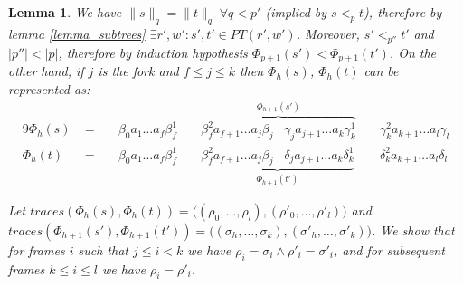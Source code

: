 \documentclass[AMA,STIX1COL]{WileyNJD-v2}
\newcommand{\Xl}{\langle}
\newcommand{\Xr}{\rangle}
\newtheorem{XLem}{Lemma}
\begin{document}
\begin{XLem}
    We have $\|s\|_q = \|t\|_q \;\forall q < p'$ (implied by $s <_p t$),
    therefore by lemma \ref{lemma_subtrees} $\exists r', w' : s', t' \in PT(r', w')$.
    Moreover, $s' <_{p''} t'$ and $|p''| < |p|$, therefore by induction hypothesis $\Phi_{p+1}(s') < \Phi_{p+1}(t')$.
    On the other hand, if $j$ is the fork and $f \leq j \leq k$ then
    $\Phi_{h}(s)$, $\Phi_{h}(t)$ can be represented as:
    \begin{alignat*}{9}
        \Phi_{h}(s)
            \;&=
                \;&& \beta_0 a_1 \dots a_f \beta_f^1
                \;&& \overbrace {\beta_f^2  a_{f+1} \dots a_j \beta_j \;\big|\; \gamma_j a_{j+1} \dots a_k \gamma_k^1}^{\Phi_{h+1}(s')}
                \;&& \gamma_k^2 a_{k+1} \dots a_l \gamma_l
                \\[-0.5em]
        \Phi_{h}(t)
            \;&=
                \;&& \beta_0 a_1 \dots a_f \beta_f^1
                \;&& \underbrace {\beta_f^2  a_{f+1} \dots a_j \beta_j \;\big|\; \delta_j a_{j+1} \dots a_k \delta_k^1}_{\Phi_{h+1}(t')}
                \;&& \delta_k^2 a_{k+1} \dots a_l \delta_l
    \end{alignat*}


    Let $traces (\Phi_{h}(s), \Phi_{h}(t)) = \big( (\rho_0, \dots, \rho_l), (\rho'_0, \dots, \rho'_l) \big)$
    and $traces (\Phi_{h+1}(s'), \Phi_{h+1}(t')) = \big( (\sigma_h, \dots, \sigma_k), (\sigma'_h, \dots, \sigma'_k) \big)$.
    We show that for frames $i$ such that $j \leq i < k$ we have
    $\rho_i = \sigma_i \wedge \rho'_i = \sigma'_i$,
    and for subsequent frames $k \leq i \leq l$ we have $\rho_i = \rho'_i$.


\end{XLem}
\end{document}
